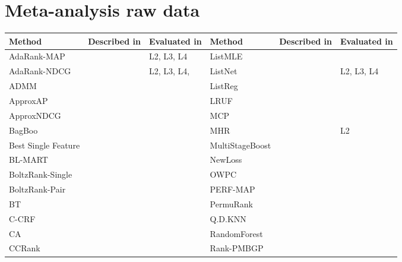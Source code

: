 \documentclass[english, authoryear, preprint]{elsarticle}
\begin{document}



\appendix
\section{Meta-analysis raw data}

\begin{table}[!hpt]
\tiny{
\begin{tabular}{lll|lll}\toprule
Method & Described in & Evaluated in & Method & Described in & Evaluated in\\
\midrule
AdaRank-MAP & \cite{Xu2007} & L2, L3, L4 & ListMLE & \cite{Xia2008} & \cite{Lin2010, Lin2011, Gao2014} \\
AdaRank-NDCG & \cite{Xu2007} & L2, L3, L4,  \cite{Busa-Fekete2013,Tan2013} & ListNet & \cite{Cao2007} & L2, L3, L4 \\ 
ADMM & \cite{Duh2011} & \cite{Duh2011} & ListReg & \cite{Wu2011} & \cite{Wu2011} \\ 
ApproxAP & \cite{Qin2010b} & \cite{Qin2010b} & LRUF & \cite{Torkestani2012b} & \cite{Torkestani2012b} \\ 
ApproxNDCG & \cite{Qin2010b} & \cite{Qin2010b} & MCP & \cite{Laporte2013} & \cite{Laporte2013} \\ 
BagBoo & \cite{Pavlov2010} & \cite{Ganjisaffar2011c} & MHR & \cite{Qin2007} & L2 \\ 
Best Single Feature &  & \cite{Gomes2013} &  MultiStageBoost & \cite{Kao2013} & \cite{Kao2013} \\ 
BL-MART & \cite{Ganjisaffar2011c} & \cite{Ganjisaffar2011c} &  NewLoss & \cite{Peng2010} & \cite{Peng2010} \\ 
BoltzRank-Single & \cite{Volkovs2009} & \cite{Volkovs2009, Volkovs2013} & OWPC & \cite{Usunier2009} & \cite{Usunier2009} \\ 
BoltzRank-Pair & \cite{Volkovs2009} & \cite{Volkovs2009, Ganjisaffar2011c, Volkovs2013} & PERF-MAP & \cite{Pan2011} & \cite{Torkestani2012b} \\ 
BT & \cite{Zhou2008} & \cite{Zhou2008} & PermuRank & \cite{Xu2008} & \cite{Xu2008} \\ 
C-CRF & \cite{Qin2008b} & \cite{Qin2008b} & Q.D.KNN & \cite{Geng2008} & \cite{Wang2013} \\ 
CA & \cite{Metzler2007} & \cite{Busa-Fekete2013,Tan2013} & RandomForest & \cite{Gomes2013} & \cite{Gomes2013} \\ 
CCRank & \cite{Wang2011c} & \cite{Wang2011c} & Rank-PMBGP & \cite{Sato2013} & \cite{Sato2013} \\ 

\end{tabular}}
\end{table}
\end{document}
